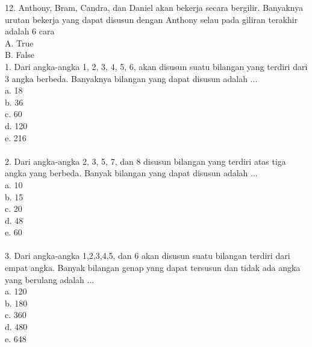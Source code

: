 \documentclass[11pt,fleqn]{book} %
\begin{document}
12. 
Anthony, Bram, Candra, dan Daniel akan bekerja secara bergilir. Banyaknya urutan bekerja yang dapat disusun dengan Anthony selau pada giliran terakhir adalah 6 cara\\

A. 
True\\

B. 
False\\

 1. Dari angka-angka 1, 2, 3, 4, 5, 6, akan disusun suatu bilangan yang terdiri dari 3 angka berbeda. Banyaknya bilangan yang dapat disusun adalah ...\\ 

a.	18\\

b.	36\\

c.	60\\

d.	120\\

e.	216\\
\\

2. Dari angka-angka 2, 3, 5, 7, dan 8 disusun bilangan yang terdiri atas tiga angka yang berbeda. Banyak bilangan yang dapat disusun adalah ...\\

a.	10\\

b.	15\\

c.	20\\

d.	48\\

e.	60\\
\\

3. Dari angka-angka 1,2,3,4,5, dan 6 akan disusun suatu bilangan terdiri dari empat angka. Banyak bilangan genap yang dapat tersusun dan tidak ada angka yang berulang adalah ...\\ 

a.	120\\

b.	180\\

c.	360\\

d.	480\\

e.	648\\
\\
\end{document}

